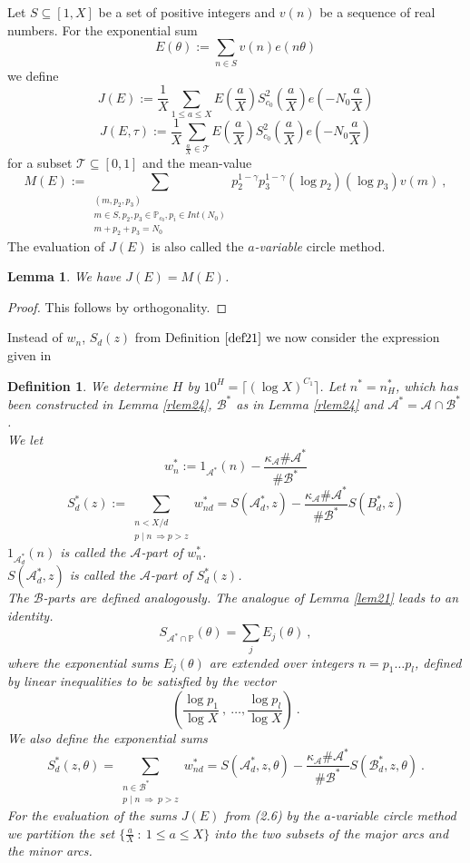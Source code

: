 \documentclass{amsart}
\newtheorem{lemma}[theorem]{Lemma}
\numberwithin{equation}{subsection}
\newtheorem{definition}[theorem]{Definition}
\begin{document}
Let $S\subseteq [1, X]$ be a set of positive integers and $v(n)$ be a sequence of real numbers. For the exponential sum
\[ 
E(\theta):= \sum_{n\in S} v(n) e(n\theta)  \tag{2.5}
\]
we define 
\[
J(E):= \frac{1}{X} \sum_{1\leq a \leq X} E\left( \frac{a}{X} \right) S_{c_0}^2\left( \frac{a}{X} \right) e\left(-N_0\frac{a}{X}\right)  \tag{2.6}
\]
\[
J(E, \tau):= \frac{1}{X} \sum_{\frac{a}{X}\in \mathcal{T}} E\left( \frac{a}{X} \right) S_{c_0}^2\left( \frac{a}{X} \right) e\left(-N_0\frac{a}{X}\right)  
\]
for a subset $\mathcal{T}\subseteq [0,1]$ and the mean-value
$$M(E):=\sum_{\substack{(m,p_2, p_3)\\ m\in S, p_2, p_3\in \mathbb{P}_{c_0}, p_i\in Int(N_0)\\ m+p_2+p_3=N_0}} p_2^{1-\gamma} p_3^{1-\gamma} (\log p_2)(\log p_3)v(m) \:,$$
The evaluation of $J(E)$ is also called the \textit{$a$-variable} circle method.

\begin{lemma}\label{rlem26}
We have
$J(E)=M(E)$.
\end{lemma}
\begin{proof}
This follows by orthogonality.
\end{proof}
Instead of $w_n$, $S_d(z)$ from Definition $\ref{def21}$ we now consider the expression given in 
\begin{definition}\label{rdef27}
We determine $H$ by $10^H=\lceil(\log X)^{C_1}\rceil$. Let $n^*=n^*_H$, which has been constructed in Lemma \ref{rlem24}, $\mathcal{B}^*$ as in Lemma \ref{rlem24} and $\mathcal{A}^*=\mathcal{A}\cap \mathcal{B}^*$.\\
We let
$$w_n^*:= 1_{\mathcal{A}^*}(n)-\frac{\kappa_{\mathcal{A}}\#\mathcal{A}^*}{\#\mathcal{B}^*}$$
$$S^*_d(z):=\sum_{\substack{n< X/d \\ p\mid n\ \Rightarrow p>z}} w^*_{nd}=S(\mathcal{A}_d^*, z)-\frac{\kappa_{\mathcal{A}}\#\mathcal{A}^*}{\#\mathcal{B}^*} S(B_d^*, z)$$
$1_{\mathcal{A}_d^*}(n)$ is called the $\mathcal{A}$-part of $w_n^*$.\\
$S(\mathcal{A}_d^*, z)$ is called the $\mathcal{A}$-part  of $S^*_d(z)$.\\
The $\mathcal{B}$-parts are defined analogously. The analogue of Lemma \ref{lem21} leads to an identity.
$$S_{\mathcal{A}^*\cap \mathbb{P}}(\theta)=\sum_j E_j(\theta)\:,$$
where the exponential sums $E_j(\theta)$ are extended over integers $n=p_1\ldots p_l$, defined by linear inequalities to be satisfied by the vector 
$$\left(\frac{\log p_1}{\log X}\:,\ \ldots, \frac{\log p_l}{\log X} \right)\:.$$
We also define the exponential sums
$$S_d^*(z, \theta)=\sum_{\substack{n\in \mathcal{B}^* \\ p\mid n\ \Rightarrow\ p>z}} w^*_{nd}= S(\mathcal{A}_d^*, z, \theta)-\frac{\kappa_{\mathcal{A}}\#\mathcal{A}^*}{\#\mathcal{B}^*} S(\mathcal{B}_d^*, z, \theta)\:.$$
For the evaluation of the sums $J(E)$ from (2.6) by the \textit{$a$-variable} circle method we partition the set $\{\frac{a}{X}\::\: 1\leq a\leq X\}$ into the two subsets of the major arcs and the minor arcs.
\end{definition}
\end{document}
